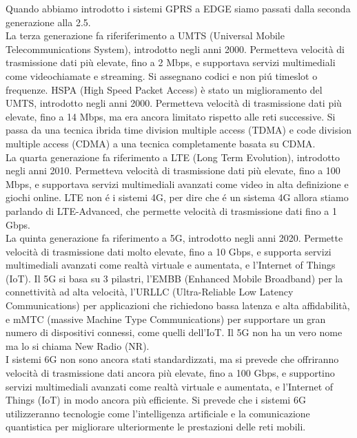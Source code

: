 Quando abbiamo introdotto i sistemi GPRS a EDGE siamo passati dalla seconda generazione alla 2.5.\\
La terza generazione fa riferiferimento a UMTS (Universal Mobile Telecommunications System), introdotto negli anni 2000. Permetteva velocità di trasmissione dati più elevate, fino a 2 Mbps, e supportava servizi multimediali come videochiamate e streaming.
Si assegnano codici e non piú timeslot o frequenze.
HSPA (High Speed Packet Access) è stato un miglioramento del UMTS, introdotto negli anni 2000. Permetteva velocità di trasmissione dati più elevate, fino a 14 Mbps, ma era ancora limitato rispetto alle reti successive.
Si passa da una tecnica ibrida time division multiple access (TDMA) e code division multiple access (CDMA) a una tecnica completamente basata su CDMA.\\
La quarta generazione fa riferimento a LTE (Long Term Evolution), introdotto negli anni 2010. Permetteva velocità di trasmissione dati più elevate, fino a 100 Mbps, e supportava servizi multimediali avanzati come video in alta definizione e giochi online.
LTE non é i sistemi 4G, per dire che é un sistema 4G allora stiamo parlando di LTE-Advanced, che permette velocità di trasmissione dati fino a 1 Gbps.\\
La quinta generazione fa riferimento a 5G, introdotto negli anni 2020. Permette velocità di trasmissione dati molto elevate, fino a 10 Gbps, e supporta servizi multimediali avanzati come realtà virtuale e aumentata, e l'Internet of Things (IoT).
Il 5G si basa su 3 pilastri, l'EMBB (Enhanced Mobile Broadband) per la connettività ad alta velocità, l'URLLC (Ultra-Reliable Low Latency Communications) per applicazioni che richiedono bassa latenza e alta affidabilità, e mMTC (massive Machine Type Communications) per supportare un gran numero di dispositivi connessi, come quelli dell'IoT.
Il 5G non ha un vero nome ma lo si chiama New Radio (NR).\\

I sistemi 6G non sono ancora stati standardizzati, ma si prevede che offriranno velocità di trasmissione dati ancora più elevate, fino a 100 Gbps, e supportino servizi multimediali avanzati come realtà virtuale e aumentata, e l'Internet of Things (IoT) in modo ancora più efficiente. Si prevede che i sistemi 6G utilizzeranno tecnologie come l'intelligenza artificiale e la comunicazione quantistica per migliorare ulteriormente le prestazioni delle reti mobili.

